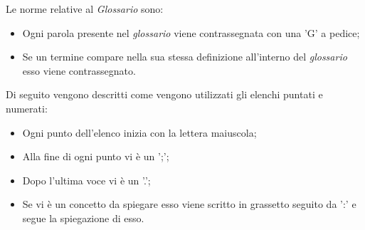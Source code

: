 Le norme relative al \textit{Glossario} sono:
\begin{itemize}
    \item Ogni parola presente nel \textit{glossario} viene contrassegnata con una 'G' a pedice;
    \item Se un termine compare nella sua stessa definizione all'interno del \textit{glossario} esso viene contrassegnato.
\end{itemize}

Di seguito vengono descritti come vengono utilizzati gli elenchi puntati e numerati:
\begin {itemize}
\item Ogni punto dell'elenco inizia con la lettera maiuscola;
\item Alla fine di ogni punto vi è un ';';
\item Dopo l'ultima voce vi è un '.';
\item Se vi è un concetto da spiegare esso viene scritto in grassetto seguito da ':' e segue la spiegazione di esso.
\end {itemize}


